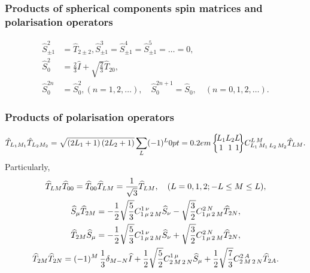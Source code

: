 \subsubsection{Products of spherical components spin matrices and polarisation operators}
\begin{align}
\widehat{S}_{ \pm 1}^{2}&=\widehat{T}_{2 \pm 2}, \widehat{S}_{ \pm 1}^{3}=\widehat{S}_{ \pm 1}^{4}=\widehat{S}_{ \pm 1}^{5}=\ldots=0 , \label{eq:2:6:59}\\
\widehat{S}_{0}^{2}&=\frac{2}{3} \widehat{I}+\sqrt{\frac{2}{3}} \widehat{T}_{20} , \label{eq:2:6:60}\\
\widehat{S}_{0}^{2 n}&=\widehat{S}_{0}^{2},(n=1,2, \ldots), \quad \widehat{S}_{0}^{2 n+1}=\widehat{S}_{0}, \quad(n=0,1,2, \ldots). \label{eq:2:6:61}
\end{align}
\subsubsection{Products of  polarisation operators}
\begin{equation}
\hat{T}_{L_{1} M_{1}} \hat{T}_{L_{2} M_{2}}=\sqrt{\left(2 L_{1}+1\right)\left(2 L_{2}+1\right)} \sum_{L}(-1)^{L}\sixj{L_{1} }{ L_{2} }{ L }{1 }{ 1 }{ 1} \clebsch{L_{1}}{M_{1}}{L_{2}}{M_{2}}{L}{M} \hat{T}_{L M}. \label{eq:2:6:62}
\end{equation}
Particularly,
\begin{gather}
\widehat{T}_{L M} \widehat{T}_{00}=\widehat{T}_{00} \widehat{T}_{L M}=\frac{1}{\sqrt{3}} \widehat{T}_{L M}, \quad(L=0,1,2 ;-L \leq M \leq L),  \label{eq:2:6:63}\\
\widehat{S}_{\mu} \widehat{T}_{2 M}=-\frac{1}{2} \sqrt{\frac{5}{3}} C_{1\,\mu\,2\,M}^{1\,\nu} \widehat{S}_{\nu}-\sqrt{\frac{3}{2}} C_{1\,\mu\,2\,M}^{2\,N} \widehat{T}_{2 N},  \label{eq:2:6:64}\\
\widehat{T}_{2 M} \widehat{S}_{\mu}=-\frac{1}{2} \sqrt{\frac{5}{3}} C_{1\,\mu\,2\,M}^{1\,\nu} \widehat{S}_{\nu}+\sqrt{\frac{3}{2}} C_{1\,\mu\,2\,M}^{2\,N} \widehat{T}_{2 N},  \label{eq:2:6:65}\\
\widehat{T}_{2 M} \widehat{T}_{2 N}=(-1)^{M} \, \frac{1}{3} \delta_{M-N} \widehat{I}+\frac{1}{2} \sqrt{\frac{5}{2}} C_{2\,M\,2\,N}^{1\,\mu} \widehat{S}_{\mu}+\frac{1}{2} \sqrt{\frac{7}{3}} C_{2\,M\,2\,N}^{2\,A} \widehat{T}_{2 A} . \label{eq:2:6:66}
\end{gather}
